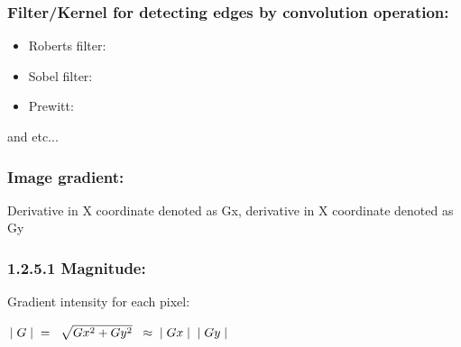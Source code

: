 \subsubsection{Filter/Kernel for detecting edges by convolution operation:}
\begin{itemize}
\item 
\begin{minipage}[t]{\linewidth}
\raggedright Roberts filter: \hspace{3cm}
\end{minipage}
\item 
\begin{minipage}[t]{\linewidth}
\raggedright Sobel filter: \hspace{3cm}
\end{minipage}
\item 
\begin{minipage}[t]{\linewidth}
\raggedright Prewitt: \hspace{3cm}
\end{minipage}
\end{itemize}
and etc...
\subsubsection{Image gradient:}
Derivative in X coordinate denoted as Gx, derivative in X coordinate denoted as Gy
\subsubsection*{1.2.5.1 Magnitude:}
Gradient intensity for each pixel:
\begin{center}
$
\mid G \mid \hspace{0.2cm} = \hspace{0.2cm} \sqrt{Gx^2 + Gy^2} \hspace{0.2cm} \approx \hspace{0.2cm} \mid Gx \mid \hspace{0.2cm} \mid Gy \mid 
$
\end{center}
